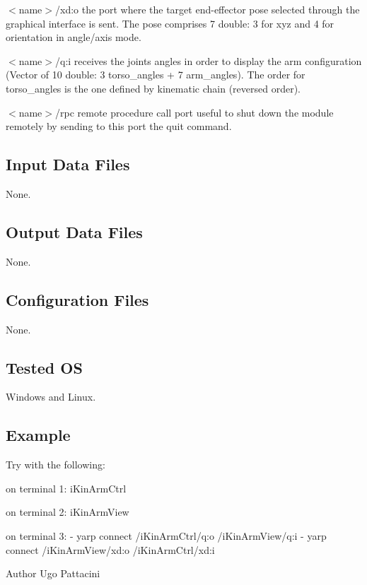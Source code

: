 \begin{DoxyItemize}
\item {\itshape } $<$name$>$/xd\+:o the port where the target end-\/effector pose selected through the graphical interface is sent. The pose comprises 7 double\+: 3 for xyz and 4 for orientation in angle/axis mode.
\item {\itshape } $<$name$>$/q\+:i receives the joints angles in order to display the arm configuration (Vector of 10 double\+: 3 torso\+\_\+angles + 7 arm\+\_\+angles). The order for torso\+\_\+angles is the one defined by kinematic chain (reversed order).
\item {\itshape } $<$name$>$/rpc remote procedure call port useful to shut down the module remotely by sending to this port the \textquotesingle{}quit\textquotesingle{} command.
\end{DoxyItemize}\hypertarget{group__icub__signalScope_in_files_sec}{}\subsection{Input Data Files}\label{group__icub__signalScope_in_files_sec}
None.\hypertarget{group__icub__signalScope_out_data_sec}{}\subsection{Output Data Files}\label{group__icub__signalScope_out_data_sec}
None.\hypertarget{group__icub__signalScope_conf_file_sec}{}\subsection{Configuration Files}\label{group__icub__signalScope_conf_file_sec}
None.\hypertarget{group__icub__signalScope_tested_os_sec}{}\subsection{Tested OS}\label{group__icub__signalScope_tested_os_sec}
Windows and Linux.\hypertarget{group__icub__signalScope_example_sec}{}\subsection{Example}\label{group__icub__signalScope_example_sec}
Try with the following\+:


\begin{DoxyCode}
on terminal 1: iKinArmCtrl 
 
on terminal 2: iKinArmView 
 
on terminal 3: 
- yarp connect /iKinArmCtrl/q:o  /iKinArmView/q:i 
- yarp connect /iKinArmView/xd:o /iKinArmCtrl/xd:i 
\end{DoxyCode}


\begin{DoxyAuthor}{Author}
Ugo Pattacini 
\end{DoxyAuthor}
